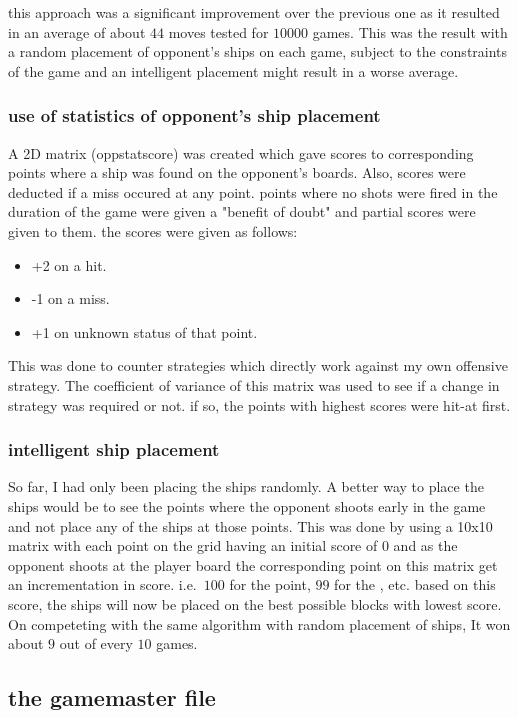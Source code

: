 \documentclass{article}
\begin{document}
	this approach was a significant improvement over the previous one as it resulted in an average of about $44$ moves tested for $10000$ games. This was the result with a random placement of opponent's ships on each game, subject to the constraints of the game and an intelligent placement might result in a worse average.
	
	\subsubsection{use of statistics of opponent's ship placement}
	
	A 2D matrix (oppstatscore) was created which gave scores to corresponding points where a ship was found on the opponent's boards. Also, scores were deducted if a miss occured at any point. points where no shots were fired in the duration of the game were given a "benefit of doubt" and partial scores were given to them. the scores were given as follows: 
	\begin{itemize}
		\item +2 on a hit.
		\item -1 on a miss.
		\item +1 on unknown status of that point.
	\end{itemize}		
This was done to counter strategies which directly work against my own offensive strategy. The coefficient of variance of this matrix was used to see if a change in strategy was required or not. if so, the points with highest scores were hit-at first.
	
	
	\subsubsection{intelligent ship placement}
	
	So far, I had only been placing the ships randomly. A better way to place the ships would be to see the points where the opponent shoots early in the game and not place any of the ships at those points. This was done by using a 10x10 matrix with each point on the grid having an initial score of $0$ and as the opponent shoots at the player board the corresponding point on this matrix get an incrementation in score. i.e.\ $100$ for the  point, $99$ for the , etc. based on this score, the ships will now be placed on the best possible blocks with lowest score. On competeting with the same algorithm with random placement of ships, It won about $9$ out of every $10$ games.
	
	\subsection{the gamemaster file} 
	
\end{document}
